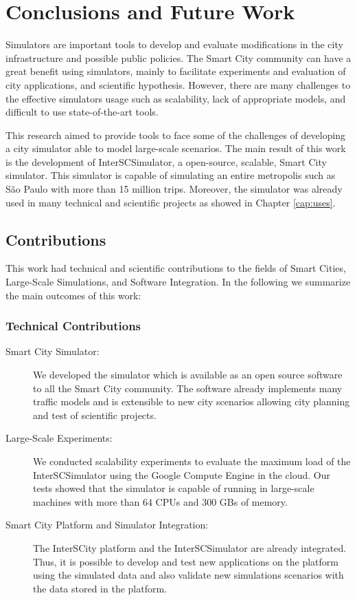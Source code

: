 \chapter{Conclusions and Future Work}
\label{cap:conclusoes}

Simulators are important tools to develop and evaluate modifications in the city infrastructure and possible public policies. The Smart City community can have a great benefit using simulators, mainly to facilitate experiments and evaluation of city applications, and scientific hypothesis. However, there are many challenges to the effective simulators usage such as scalability, lack of appropriate models, and difficult to use state-of-the-art tools.

This research aimed to provide tools to face some of the challenges of developing a city simulator able to model large-scale scenarios. The main result of this work is the development of InterSCSimulator, a open-source, scalable, Smart City simulator. This simulator is capable of simulating an entire metropolis such as S\~ao Paulo with more than 15 million trips. Moreover, the simulator was already used in many technical and scientific projects as showed in Chapter \ref{cap:uses}.

\section{Contributions}

This work had technical and scientific contributions to the fields of Smart Cities, Large-Scale Simulations, and Software Integration. In the following we summarize the main outcomes of this work:

\subsection{Technical Contributions}

\begin{description}

\item[Smart City Simulator:] We developed the simulator which is available as an open source software to all the Smart City community. The software already implements many traffic models and is extensible to new city scenarios allowing city planning and test of scientific projects.

\item[Large-Scale Experiments:] We conducted scalability experiments to evaluate the maximum load of the InterSCSimulator using the Google Compute Engine in the cloud. Our tests showed that the simulator is capable of running in large-scale machines with more than 64 CPUs and 300 GBs of memory.

\item[Smart City Platform and Simulator Integration:] The InterSCity platform and the InterSCSimulator are already integrated. Thus, it is possible to develop and test new applications on the platform using the simulated data and also validate new simulations scenarios with the data stored in the platform.

\end{description}

